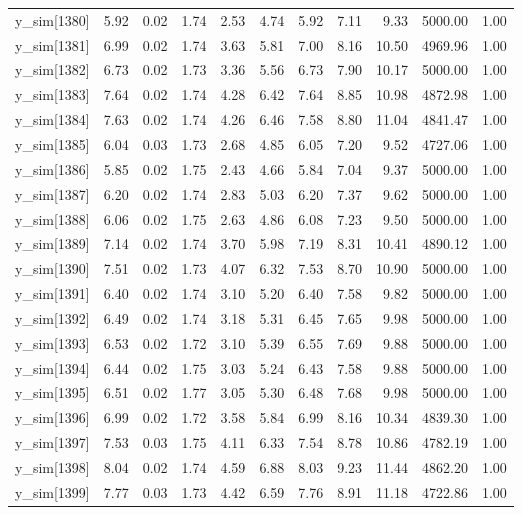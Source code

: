 \begin{table}[ht]
\begin{tabular}{rrrrrrrrrrr}
  y\_sim[1380] & 5.92 & 0.02 & 1.74 & 2.53 & 4.74 & 5.92 & 7.11 & 9.33 & 5000.00 & 1.00 \\ 
  y\_sim[1381] & 6.99 & 0.02 & 1.74 & 3.63 & 5.81 & 7.00 & 8.16 & 10.50 & 4969.96 & 1.00 \\ 
  y\_sim[1382] & 6.73 & 0.02 & 1.73 & 3.36 & 5.56 & 6.73 & 7.90 & 10.17 & 5000.00 & 1.00 \\ 
  y\_sim[1383] & 7.64 & 0.02 & 1.74 & 4.28 & 6.42 & 7.64 & 8.85 & 10.98 & 4872.98 & 1.00 \\ 
  y\_sim[1384] & 7.63 & 0.02 & 1.74 & 4.26 & 6.46 & 7.58 & 8.80 & 11.04 & 4841.47 & 1.00 \\ 
  y\_sim[1385] & 6.04 & 0.03 & 1.73 & 2.68 & 4.85 & 6.05 & 7.20 & 9.52 & 4727.06 & 1.00 \\ 
  y\_sim[1386] & 5.85 & 0.02 & 1.75 & 2.43 & 4.66 & 5.84 & 7.04 & 9.37 & 5000.00 & 1.00 \\ 
  y\_sim[1387] & 6.20 & 0.02 & 1.74 & 2.83 & 5.03 & 6.20 & 7.37 & 9.62 & 5000.00 & 1.00 \\ 
  y\_sim[1388] & 6.06 & 0.02 & 1.75 & 2.63 & 4.86 & 6.08 & 7.23 & 9.50 & 5000.00 & 1.00 \\ 
  y\_sim[1389] & 7.14 & 0.02 & 1.74 & 3.70 & 5.98 & 7.19 & 8.31 & 10.41 & 4890.12 & 1.00 \\ 
  y\_sim[1390] & 7.51 & 0.02 & 1.73 & 4.07 & 6.32 & 7.53 & 8.70 & 10.90 & 5000.00 & 1.00 \\ 
  y\_sim[1391] & 6.40 & 0.02 & 1.74 & 3.10 & 5.20 & 6.40 & 7.58 & 9.82 & 5000.00 & 1.00 \\ 
  y\_sim[1392] & 6.49 & 0.02 & 1.74 & 3.18 & 5.31 & 6.45 & 7.65 & 9.98 & 5000.00 & 1.00 \\ 
  y\_sim[1393] & 6.53 & 0.02 & 1.72 & 3.10 & 5.39 & 6.55 & 7.69 & 9.88 & 5000.00 & 1.00 \\ 
  y\_sim[1394] & 6.44 & 0.02 & 1.75 & 3.03 & 5.24 & 6.43 & 7.58 & 9.88 & 5000.00 & 1.00 \\ 
  y\_sim[1395] & 6.51 & 0.02 & 1.77 & 3.05 & 5.30 & 6.48 & 7.68 & 9.98 & 5000.00 & 1.00 \\ 
  y\_sim[1396] & 6.99 & 0.02 & 1.72 & 3.58 & 5.84 & 6.99 & 8.16 & 10.34 & 4839.30 & 1.00 \\ 
  y\_sim[1397] & 7.53 & 0.03 & 1.75 & 4.11 & 6.33 & 7.54 & 8.78 & 10.86 & 4782.19 & 1.00 \\ 
  y\_sim[1398] & 8.04 & 0.02 & 1.74 & 4.59 & 6.88 & 8.03 & 9.23 & 11.44 & 4862.20 & 1.00 \\ 
  y\_sim[1399] & 7.77 & 0.03 & 1.73 & 4.42 & 6.59 & 7.76 & 8.91 & 11.18 & 4722.86 & 1.00 \\ 

\end{tabular}
\end{table}
